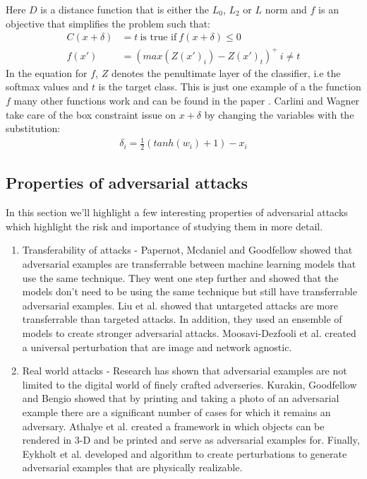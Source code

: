 \documentclass[journal,onecolumn]{IEEEtran}
\begin{document}
\begin{enumerate}
Here $D$ is a distance function that is either the $L_0$, $L_2$ or $L$ norm and $f$ is an objective that simplifies the problem such that:
\begin{align*}
C(x + \delta) &= t \ \text{is true if} \ f(x + \delta) \leq 0\\
f(x') &= (max(Z(x')_i) - Z(x')_t)^+ \ i \neq t
\end{align*}
In the equation for $f$, $Z$ denotes the penultimate layer of the classifier, i.e the softmax values and $t$ is the target class. This is just one example of a the function $f$ many other functions work and can be found in the paper \cite{carlini_towards_2016}. Carlini and Wagner \cite{carlini_towards_2016} take care of the box constraint issue on $x + \delta$ by changing the variables with the substitution:
\begin{align*}
\delta_i = \frac{1}{2}(tanh(w_i) + 1) - x_i
\end{align*}

\end{enumerate}

\subsection{Properties of adversarial attacks}
In this section we'll highlight a few interesting properties of adversarial attacks which highlight the risk and importance of studying them in more detail.
\begin{enumerate}
\item Transferability of attacks - Papernot, Mcdaniel and Goodfellow \cite{papernot_transferability_2016} showed that adversarial examples are transferrable between machine learning models that use the same technique. They went one step further and showed that the models don't need to be using the same technique but still have transferrable adversarial examples. Liu et al. \cite{liu_delving_2016} showed that untargeted attacks are more transferrable than targeted attacks. In addition, they used an ensemble of models to create stronger adversarial attacks. Moosavi-Dezfooli et al. \cite{moosavi-dezfooli_universal_2016} created a universal perturbation that are image and network agnostic.
\item Real world attacks - Research has shown that adversarial examples are not limited to the digital world of finely crafted adverseries. Kurakin, Goodfellow and Bengio \cite{kurakin_adversarial_2016} showed that by printing and taking a photo of an adversarial example there are a significant number of cases for which it remains an adversary. Athalye et al. \cite{athalye_synthesizing_2017} created a framework in which objects can be rendered in 3-D and be printed and serve as adversarial examples for. Finally, Eykholt et al. \cite{eykholt_robust_2017} developed and algorithm to create perturbations to generate adversarial examples that are physically realizable. 
\end{enumerate}
\end{document}
